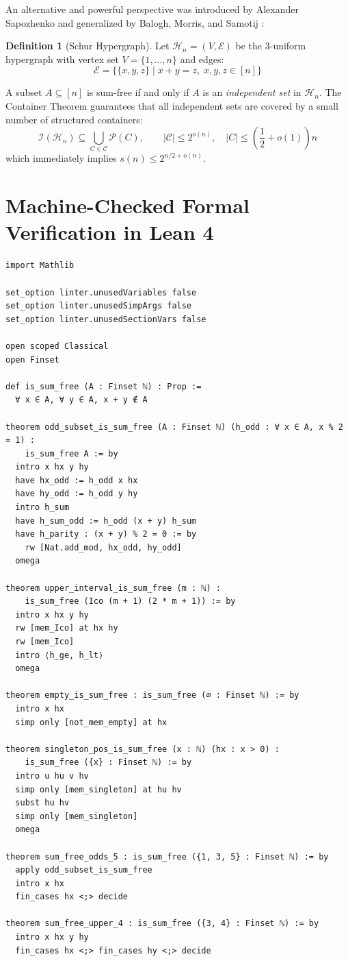 \documentclass[11pt,a4paper]{article}
\theoremstyle{definition}
\newtheorem{definition}[theorem]{Definition}
\begin{document}
An alternative and powerful perspective was introduced by Alexander Sapozhenko \cite{sapozhenko2003} and generalized by Balogh, Morris, and Samotij \cite{balogh2015containers}:

\begin{definition}[Schur Hypergraph]\label{def:schur_hypergraph}
Let $\mathcal{H}_n = (V, \mathcal{E})$ be the 3-uniform hypergraph with vertex set $V = \{1, \dots, n\}$ and edges:
\begin{equation}\label{eq:schur_edges}
\mathcal{E} = \{ \{x, y, z\} \mid x + y = z, \; x, y, z \in [n] \}
\end{equation}
\end{definition}

A subset $A \subseteq [n]$ is sum-free if and only if $A$ is an \emph{independent set} in $\mathcal{H}_n$.
The Container Theorem guarantees that all independent sets are covered by a small number of structured containers:
\[ \mathcal{I}(\mathcal{H}_n) \subseteq \bigcup_{C \in \mathcal{C}} \mathcal{P}(C), \qquad |\mathcal{C}| \le 2^{o(n)}, \quad |C| \le \left(\frac{1}{2} + o(1)\right) n \]
which immediately implies $s(n) \le 2^{n/2 + o(n)}$.

\section{Machine-Checked Formal Verification in Lean 4}

\begin{lstlisting}[caption={Formal Lean 4 Implementation of Cameron-Erdős Sum-Free Invariants}]
import Mathlib

set_option linter.unusedVariables false
set_option linter.unusedSimpArgs false
set_option linter.unusedSectionVars false

open scoped Classical
open Finset

def is_sum_free (A : Finset ℕ) : Prop :=
  ∀ x ∈ A, ∀ y ∈ A, x + y ∉ A

theorem odd_subset_is_sum_free (A : Finset ℕ) (h_odd : ∀ x ∈ A, x % 2 = 1) :
    is_sum_free A := by
  intro x hx y hy
  have hx_odd := h_odd x hx
  have hy_odd := h_odd y hy
  intro h_sum
  have h_sum_odd := h_odd (x + y) h_sum
  have h_parity : (x + y) % 2 = 0 := by
    rw [Nat.add_mod, hx_odd, hy_odd]
  omega

theorem upper_interval_is_sum_free (m : ℕ) :
    is_sum_free (Ico (m + 1) (2 * m + 1)) := by
  intro x hx y hy
  rw [mem_Ico] at hx hy
  rw [mem_Ico]
  intro ⟨h_ge, h_lt⟩
  omega

theorem empty_is_sum_free : is_sum_free (∅ : Finset ℕ) := by
  intro x hx
  simp only [not_mem_empty] at hx

theorem singleton_pos_is_sum_free (x : ℕ) (hx : x > 0) :
    is_sum_free ({x} : Finset ℕ) := by
  intro u hu v hv
  simp only [mem_singleton] at hu hv
  subst hu hv
  simp only [mem_singleton]
  omega

theorem sum_free_odds_5 : is_sum_free ({1, 3, 5} : Finset ℕ) := by
  apply odd_subset_is_sum_free
  intro x hx
  fin_cases hx <;> decide

theorem sum_free_upper_4 : is_sum_free ({3, 4} : Finset ℕ) := by
  intro x hx y hy
  fin_cases hx <;> fin_cases hy <;> decide
\end{lstlisting}
\end{document}
